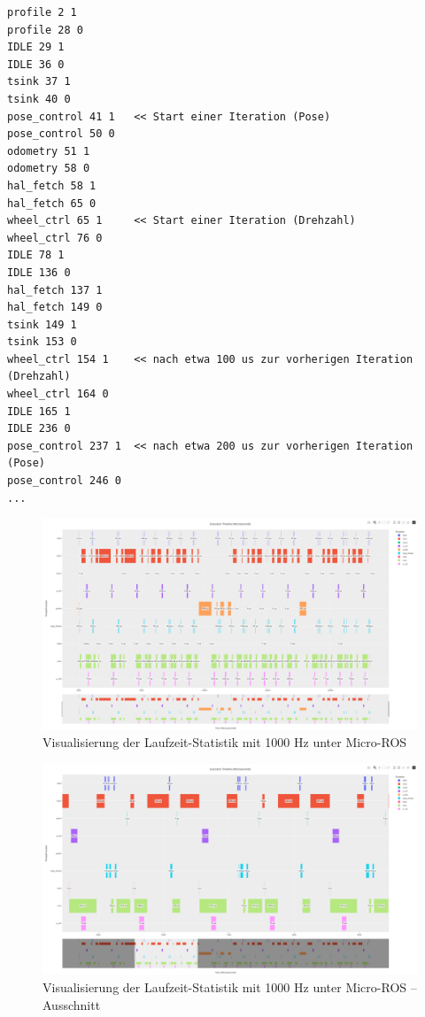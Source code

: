 \begin{code}
\begin{verbatim}
profile 2 1
profile 28 0
IDLE 29 1
IDLE 36 0
tsink 37 1
tsink 40 0
pose_control 41 1   << Start einer Iteration (Pose)
pose_control 50 0
odometry 51 1
odometry 58 0
hal_fetch 58 1
hal_fetch 65 0
wheel_ctrl 65 1     << Start einer Iteration (Drehzahl)
wheel_ctrl 76 0
IDLE 78 1
IDLE 136 0
hal_fetch 137 1
hal_fetch 149 0
tsink 149 1
tsink 153 0
wheel_ctrl 154 1    << nach etwa 100 us zur vorherigen Iteration (Drehzahl)
wheel_ctrl 164 0
IDLE 165 1
IDLE 236 0
pose_control 237 1  << nach etwa 200 us zur vorherigen Iteration (Pose)
pose_control 246 0
...
\end{verbatim}
\end{code}

\begin{figure}[H]
    \centering
    \includegraphics[width=1\textwidth]{assets/micro_ros_profiling_1000hz}
    \caption{Visualisierung der Laufzeit-Statistik mit 1000 Hz unter Micro-ROS}
\end{figure}
\begin{figure}[H]
    \centering
    \includegraphics[width=1\textwidth]{assets/micro_ros_profiling_1000hz_ausschnitt}
    \caption{Visualisierung der Laufzeit-Statistik mit 1000 Hz unter Micro-ROS
    -- Ausschnitt}
\end{figure}

